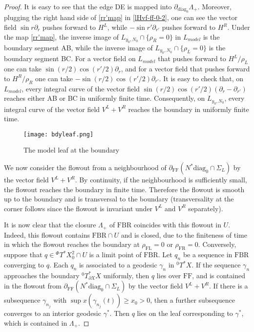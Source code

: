 \documentclass[10pt, a4paper, twoside]{amsart}
\numberwithin{equation}{section}
\theoremstyle{remark}
\begin{document}
\begin{proof}
It is easy to see that the edge DE is mapped into $\partial_{\mathrm{diag}_0} \Lambda_+$. Moreover, plugging the right hand side of \eqref{rr'map} in \eqref{lHvf-ff-0-2}, one can see the vector field $\sin r \partial_r$ pushes forward to $H^L$, while $-\sin r' \partial_{r'}$ pushes forward to $H^R$. Under the map \eqref{rr'map}, the inverse image of $L_{y_0, N_0} \cap \{ \rho_R = 0 \}$ in $L_{model}$ is the boundary segment AB, while the inverse image of $L_{y_0, N_0} \cap \{\rho_L = 0\}$ is the boundary segment BC. 
For a vector field on $L_{model}$ that pushes forward to $H^L/\rho_L$ one can take $\sin(r/2) \cos(r'/2) \partial_r$, and for a vector field that pushes forward to $H^R/\rho_R$ one can take $-\sin(r/2) \cos(r'/2) \partial_{r'}$. It is easy to check that, on $L_{model}$, every integral curve of the vector field $\sin(r/2) \cos(r'/2) ( \partial_r - \partial_{r'})$ reaches either AB or BC in uniformly finite time. Consequently, on $L_{y_0, N_0}$, every integral curve of the vector field $V^L + V^R$ reaches the boundary in uniformly finite time. 

\begin{center}\begin{figure}
\texttt{[image: bdyleaf.png]}
\caption{\label{fig:modelleaf}The model leaf at the boundary}
\end{figure}
\end{center}

We now consider the flowout from a neighbourhood  of $\partial_{\mathrm{FF}} ( N^* {\mathrm{diag}_0} \cap \Sigma_L)$ by the vector field $V^L + V^R$. By continuity, if the neighbourhood is sufficiently small, the flowout reaches the boundary in finite time. Therefore the flowout is smooth up to the boundary and is transversal to the boundary (transversality at the corner follows since the flowout is invariant under $V^L$ and $V^R$ separately). 

It is now clear that the closure $\Lambda_+$ of ${\mathrm{FBR}}$ coincides with this flowout in $U$.
Indeed, this flowout contains ${\mathrm{FBR}} \cap U$ and is closed, due to the finiteness of time in which the flowout reaches the boundary at $\rho_{\mathrm{FL}} = 0$ or $\rho_{\mathrm{FR}} = 0$. Conversely, suppose that $q \in {}^\Phi T^* X^2_0 \cap U$ is a limit point of ${\mathrm{FBR}}$. 
Let $q_n$ be a sequence in ${\mathrm{FBR}}$ converging to $q$. Each $q_n$ is associated to a geodesic $\gamma_n$ in ${}^0T^* X$. If the sequence $\gamma_n$ approaches the boundary ${}^0T^*_{\partial X} X$ uniformly, then $q$ lies over ${\mathrm{FF}}$, and is contained in the flowout from $\partial_{\mathrm{FF}} ( N^* {\mathrm{diag}_0} \cap \Sigma_L)$ by the vector field $V^L + V^R$. If there is a subsequence $\gamma_{n_j}$ with $\sup x(\gamma_{n_j}(t)) \geq x_0 > 0$, then a further subsequence converges to an interior geodesic $\gamma^*$. Then $q$ lies on the  leaf corresponding to $\gamma^*$, which is contained in $\Lambda_+$.   


\end{proof}
\end{document}
